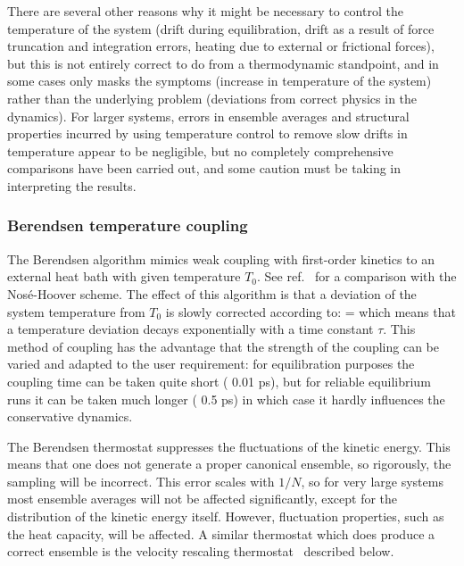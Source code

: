 There are several other reasons why it might be necessary to control
the temperature of the system (drift during equilibration, drift as a
result of force truncation and integration errors, heating due to
external or frictional forces), but this is not entirely correct to do
from a thermodynamic standpoint, and in some cases only masks the
symptoms (increase in temperature of the system) rather than the
underlying problem (deviations from correct physics in the dynamics).
For larger systems, errors in ensemble averages and structural
properties incurred by using temperature control to remove slow drifts
in temperature appear to be negligible, but no completely
comprehensive comparisons have been carried out, and some caution must
be taking in interpreting the results.

\subsubsection{Berendsen temperature coupling}
The Berendsen algorithm mimics weak coupling with first-order 
kinetics to an external heat bath with given temperature $T_0$. 
See ref.~\cite{Berendsen91} for a comparison with the
Nos{\'e}-Hoover scheme. The effect of this algorithm is
that a deviation of the system temperature from $T_0$ is slowly
corrected according to:
\beq
{} = 
\label{eqn:Tcoupling}
\eeq
which means that a temperature deviation decays exponentially with a
time constant $\tau$.
This method of coupling has the advantage that the strength of the
coupling can be varied and adapted to the user requirement: for
equilibration purposes the coupling time can be taken quite short
({\eg} 0.01 ps), but for reliable equilibrium runs it can be taken much
longer ({\eg} 0.5 ps) in which case it hardly influences the
conservative dynamics. 

The Berendsen thermostat suppresses the fluctuations of the kinetic
energy.  This means that one does not generate a proper canonical
ensemble, so rigorously, the sampling will be incorrect.  This
error scales with $1/N$, so for very large systems most ensemble
averages will not be affected significantly, except for the
distribution of the kinetic energy itself.  However, fluctuation
properties, such as the heat capacity, will be affected.  A similar
thermostat which does produce a correct ensemble is the velocity
rescaling thermostat~\cite{Bussi2007a} described below.


